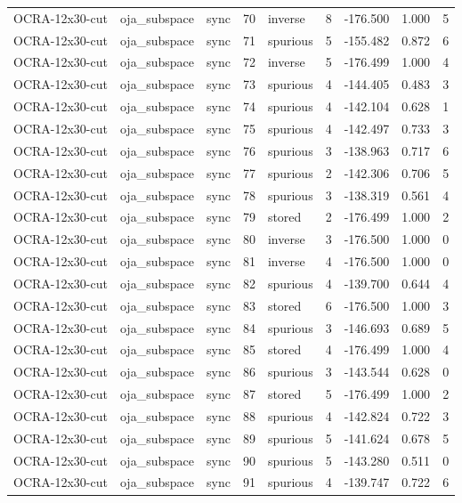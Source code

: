 \begin{tabular}{lllrlrrrr}
OCRA-12x30-cut & oja\_subspace & sync & 70 & inverse & 8 & -176.500 & 1.000 & 5 \\
OCRA-12x30-cut & oja\_subspace & sync & 71 & spurious & 5 & -155.482 & 0.872 & 6 \\
OCRA-12x30-cut & oja\_subspace & sync & 72 & inverse & 5 & -176.499 & 1.000 & 4 \\
OCRA-12x30-cut & oja\_subspace & sync & 73 & spurious & 4 & -144.405 & 0.483 & 3 \\
OCRA-12x30-cut & oja\_subspace & sync & 74 & spurious & 4 & -142.104 & 0.628 & 1 \\
OCRA-12x30-cut & oja\_subspace & sync & 75 & spurious & 4 & -142.497 & 0.733 & 3 \\
OCRA-12x30-cut & oja\_subspace & sync & 76 & spurious & 3 & -138.963 & 0.717 & 6 \\
OCRA-12x30-cut & oja\_subspace & sync & 77 & spurious & 2 & -142.306 & 0.706 & 5 \\
OCRA-12x30-cut & oja\_subspace & sync & 78 & spurious & 3 & -138.319 & 0.561 & 4 \\
OCRA-12x30-cut & oja\_subspace & sync & 79 & stored & 2 & -176.499 & 1.000 & 2 \\
OCRA-12x30-cut & oja\_subspace & sync & 80 & inverse & 3 & -176.500 & 1.000 & 0 \\
OCRA-12x30-cut & oja\_subspace & sync & 81 & inverse & 4 & -176.500 & 1.000 & 0 \\
OCRA-12x30-cut & oja\_subspace & sync & 82 & spurious & 4 & -139.700 & 0.644 & 4 \\
OCRA-12x30-cut & oja\_subspace & sync & 83 & stored & 6 & -176.500 & 1.000 & 3 \\
OCRA-12x30-cut & oja\_subspace & sync & 84 & spurious & 3 & -146.693 & 0.689 & 5 \\
OCRA-12x30-cut & oja\_subspace & sync & 85 & stored & 4 & -176.499 & 1.000 & 4 \\
OCRA-12x30-cut & oja\_subspace & sync & 86 & spurious & 3 & -143.544 & 0.628 & 0 \\
OCRA-12x30-cut & oja\_subspace & sync & 87 & stored & 5 & -176.499 & 1.000 & 2 \\
OCRA-12x30-cut & oja\_subspace & sync & 88 & spurious & 4 & -142.824 & 0.722 & 3 \\
OCRA-12x30-cut & oja\_subspace & sync & 89 & spurious & 5 & -141.624 & 0.678 & 5 \\
OCRA-12x30-cut & oja\_subspace & sync & 90 & spurious & 5 & -143.280 & 0.511 & 0 \\
OCRA-12x30-cut & oja\_subspace & sync & 91 & spurious & 4 & -139.747 & 0.722 & 6 \\

\end{tabular}
